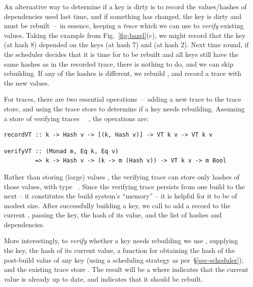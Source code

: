 An alternative way to determine if a key is dirty is to record the
values/hashes of dependencies used last time, and if something has changed, the
key is dirty and must be rebuilt~--~in essence, keeping a \emph{trace}
which we can use to \emph{verify} existing values. Taking the example from
Fig.~\ref{fig-bazel}(c), we might record that the key  (at hash 8)
depended on the keys  (at hash 7) and  (at hash 2). Next
time round, if the scheduler decides that it is time for  to be
rebuilt and all keys still have the same hashes as in the recorded trace, there
is nothing to do, and we can skip rebuilding. If any of the hashes is different,
we rebuild , and record a trace with the new values.

For traces, there are two essential operations~--~adding a new trace to the
trace store, and using the trace store to determine if a key needs rebuilding.
Assuming a store of verifying traces ~~, the operations are:

\vspace{1mm}
\begin{verbatim}
recordVT :: k -> Hash v -> [(k, Hash v)] -> VT k v -> VT k v
\end{verbatim}
\vspace{-2mm}
\begin{verbatim}
verifyVT :: (Monad m, Eq k, Eq v)
         => k -> Hash v -> (k -> m (Hash v)) -> VT k v -> m Bool
\end{verbatim}
\vspace{1mm}

\noindent
Rather than storing (large) values , the verifying trace  can store
only hashes of those values, with type ~. Since the verifying
trace persists from one build to the next -- it constitutes the build system's
``memory'' -- it is helpful for it to be of modest size. After successfully
building a key, we call  to add a record to the current ,
passing the key, the hash of its value, and the list of hashes and dependencies.

More interestingly, to \emph{verify} whether a key needs rebuilding we use
, supplying the key, the hash of its current value, a function for
obtaining the hash of the post-build value of any key (using a scheduling
strategy as per~\S\ref{sec-scheduler}), and the existing trace store .
The result will be a  where  indicates that the current value
is already up to date, and  indicates that it should be rebuilt.


